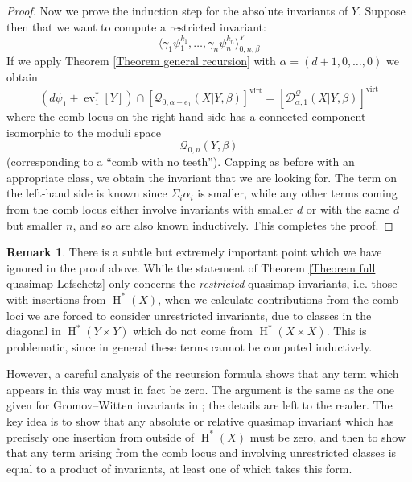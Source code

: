 \documentclass[11pt]{amsart}
\newcommand{\Q}[4]{\mathcal{Q}_{#1,#2}(#3,#4)}
\newcommand{\virt}[1]{[#1]^{\operatorname{virt}}}
\newcommand{\HH}{\operatorname{H}}
\newcommand{\ev}{\operatorname{ev}}
\theoremstyle{definition}
\theoremstyle{definition}
\newtheorem{remark}[thm]{Remark}
\begin{document}
\begin{proof}
Now we prove the induction step for the absolute invariants of $Y$. Suppose then that we want to compute a restricted invariant:
\begin{equation*} \langle \gamma_1 \psi_1^{k_1}, \ldots, \gamma_n \psi_n^{k_n} \rangle_{0,n,\beta}^{Y} \end{equation*}
 If we apply Theorem \ref{Theorem general recursion} with $\alpha=(d+1,0,\ldots,0)$ we obtain
\begin{equation*} (d \psi_1 + \ev_1^* [Y]) \cap \virt{\Q{0}{\alpha-e_1}{X|Y}{\beta}} = \virt{\mathcal D^\mathcal{Q}_{\alpha,1}(X|Y,\beta)} \end{equation*}
where the comb locus on the right-hand side has a connected component isomorphic to the moduli space
\begin{equation*} \Q{0}{n}{Y}{\beta} \end{equation*}
(corresponding to a ``comb with no teeth''). Capping as before with an appropriate class, we obtain the invariant that we are looking for. The term on the left-hand side is known since $\Sigma_i \alpha_i$ is smaller, while any other terms coming from the comb locus either involve invariants with smaller $d$ or with the same $d$ but smaller $n$, and so are also known inductively. This completes the proof. \end{proof}

\begin{remark} There is a subtle but extremely important point which we have ignored in the proof above. While the statement of Theorem \ref{Theorem full quasimap Lefschetz} only concerns the \emph{restricted} quasimap invariants, i.e. those with insertions from $\HH^*(X)$, when we calculate contributions from the comb loci we are forced to consider unrestricted invariants, due to classes in the diagonal in $\HH^*(Y\times Y)$ which do not come from $\HH^*(X\times X)$. This is problematic, since in general these terms cannot be computed inductively.

However, a careful analysis of the recursion formula shows that any term which appears in this way must in fact be zero. The argument is the same as the one given for Gromov--Witten invariants in \cite[\S 2.5]{GathmannThesis}; the details are left to the reader. The key idea is to show that any absolute or relative quasimap invariant which has precisely one insertion from outside of $\HH^*(X)$ must be zero, and then to show that any term arising from the comb locus and involving unrestricted classes is equal to a product of invariants, at least one of which takes this form.\end{remark}
\end{document}
